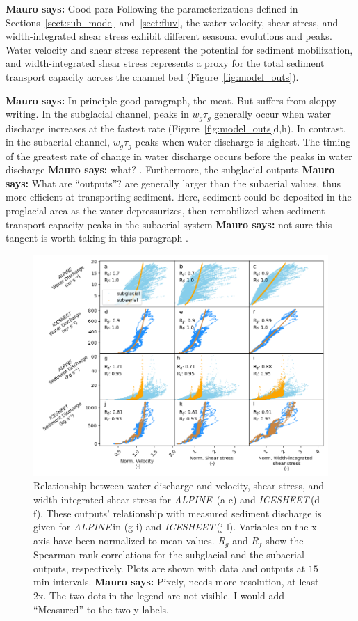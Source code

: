 \documentclass[draft]{agujournal2019}
\newcommand{\mauro}[1]{{\textbf{\color{green}Mauro says:} \color{green} #1} }
\newcommand{\alpine}{\textit{ALPINE}\,}
\newcommand{\icesheet}{\textit{ICESHEET}\,}
\newcommand{\unit}[1]{$\mathrm{#1}$}
\begin{document}
\mauro{Good para}
Following the parameterizations defined in Sections~\ref{sect:sub_mode}~and~\ref{sect:fluv}, the water velocity, shear stress, and width-integrated shear stress exhibit different seasonal evolutions and peaks.
Water velocity and shear stress represent the potential for sediment mobilization, and width-integrated shear stress represents a proxy for the total sediment transport capacity across the channel bed (Figure~\ref{fig:model_outs}).

\mauro{In principle good paragraph, the meat.  But suffers from sloppy writing.}
In the subglacial channel, peaks in $w_g\tau_g$ generally occur when water discharge increases at the fastest rate (Figure~\ref{fig:model_outs}d,h).
In contrast, in the subaerial channel,   $w_g\tau_g$  peaks when water discharge is highest.
The timing of the greatest rate of change in water discharge occurs before the peaks in water discharge \mauro{what?}.
Furthermore, the subglacial outputs \mauro{What are ``outputs''?}  are generally larger than the subaerial values, thus more efficient at transporting sediment.
Here, sediment could be deposited in the proglacial area as the water depressurizes, then remobilized when sediment transport capacity peaks in the subaerial system \mauro{not sure this tangent is worth taking in this paragraph}.

\begin{figure}[h]
  \centering
  \includegraphics[width=0.9\linewidth]{Fig3.png}
  \caption{
    Relationship between water discharge and velocity, shear stress, and width-integrated shear stress for \alpine{} (a-c) and \icesheet (d-f).
    These outputs' relationship with measured sediment discharge is given for \alpine in (g-i) and \icesheet (j-l).
    Variables on the x-axis have been normalized to mean values.
    $R_g$ and $R_f$ show the Spearman rank correlations for the subglacial and the subaerial outputs, respectively.
    Plots are shown with data and outputs at $15$\unit{min} intervals.
    \mauro{Pixely, needs more resolution, at least 2x. The two dots in the legend are not visible.  I would add ``Measured'' to the two y-labels.}
  }
  \label{fig:Qw_vari}
\end{figure}
\end{document}
